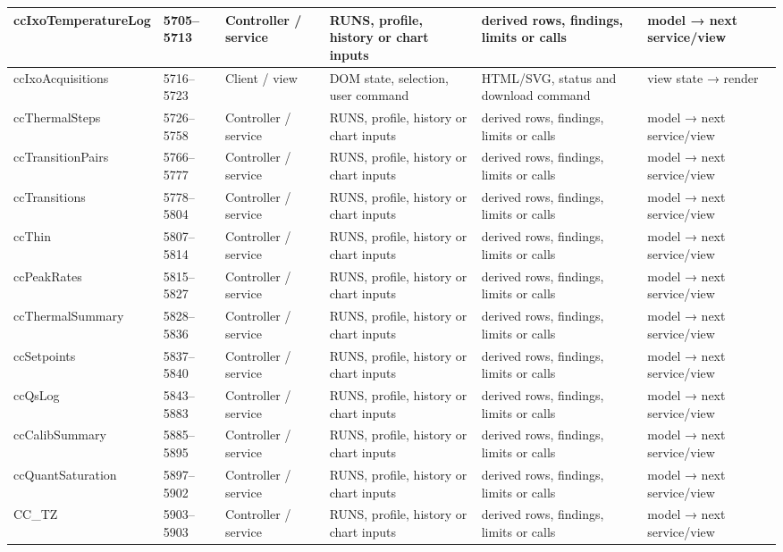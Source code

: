 \begin{landscape}
\begin{longtable}{@{}p{3.2cm}p{1.45cm}p{2.7cm}p{4.0cm}p{4.0cm}p{3.0cm}@{}}
ccIxoTemperatureLog & 5705--5713 & Controller / service & RUNS, profile, history or chart inputs & derived rows, findings, limits or calls & model → next service/view \\\hline
ccIxoAcquisitions & 5716--5723 & Client / view & DOM state, selection, user command & HTML/SVG, status and download command & view state → render \\\hline
ccThermalSteps & 5726--5758 & Controller / service & RUNS, profile, history or chart inputs & derived rows, findings, limits or calls & model → next service/view \\\hline
ccTransitionPairs & 5766--5777 & Controller / service & RUNS, profile, history or chart inputs & derived rows, findings, limits or calls & model → next service/view \\\hline
ccTransitions & 5778--5804 & Controller / service & RUNS, profile, history or chart inputs & derived rows, findings, limits or calls & model → next service/view \\\hline
ccThin & 5807--5814 & Controller / service & RUNS, profile, history or chart inputs & derived rows, findings, limits or calls & model → next service/view \\\hline
ccPeakRates & 5815--5827 & Controller / service & RUNS, profile, history or chart inputs & derived rows, findings, limits or calls & model → next service/view \\\hline
ccThermalSummary & 5828--5836 & Controller / service & RUNS, profile, history or chart inputs & derived rows, findings, limits or calls & model → next service/view \\\hline
ccSetpoints & 5837--5840 & Controller / service & RUNS, profile, history or chart inputs & derived rows, findings, limits or calls & model → next service/view \\\hline
ccQsLog & 5843--5883 & Controller / service & RUNS, profile, history or chart inputs & derived rows, findings, limits or calls & model → next service/view \\\hline
ccCalibSummary & 5885--5895 & Controller / service & RUNS, profile, history or chart inputs & derived rows, findings, limits or calls & model → next service/view \\\hline
ccQuantSaturation & 5897--5902 & Controller / service & RUNS, profile, history or chart inputs & derived rows, findings, limits or calls & model → next service/view \\\hline
CC\_TZ & 5903--5903 & Controller / service & RUNS, profile, history or chart inputs & derived rows, findings, limits or calls & model → next service/view \\\hline

\end{longtable}
\end{landscape}
